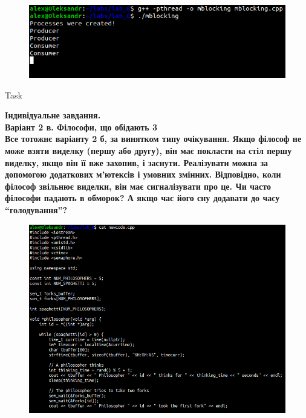 \documentclass[a4paper,12pt]{article}
\newcommand{\RomanNumeralCaps}[1]{\MakeUppercase{\romannumeral #1}}
\begin{document}
\newpage
    \begin{figure}[h!]
        \begin{minipage}[h]{1\linewidth}
            \centering
            \includegraphics[width=0.8\linewidth]{Prt sc/Figure_3.png}  
        \end{minipage}
    \end{figure}
    \begin{center}
        \Large{Task \RomanNumeralCaps{4}}
    \end{center}
    \textbf{Індивідуальне завдання. \\
    Варіант 2 в. Філософи, що обідають 3 \\
    Все тотожнє варіанту 2 б, за винятком типу очікування.
    Якщо філософ не може взяти виделку (першу або другу), він має покласти на стіл першу виделку, якщо він її вже
    захопив, і заснути. Реалізувати можна за допомогою додаткових м’ютексів і умовних змінних. Відповідно, коли
    філософ звільнює виделки, він має сигналізувати про це. Чи часто філософи падають в обморок? А якщо час його сну додавати до часу “голодування”?}
    \begin{figure}[h!]
        \begin{minipage}[h]{1\linewidth}
            \centering
            \includegraphics[width=0.8\linewidth]{Prt sc/Figure_4_1.png}  
        \end{minipage}
    \end{figure}
\end{document}
